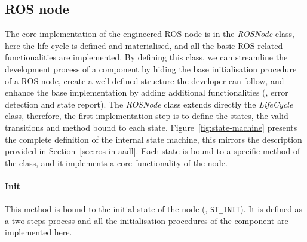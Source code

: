 \subsection{ROS node}
The core implementation of the engineered ROS node is in the \textit{ROSNode} class, here the life cycle is defined and materialised, and all the basic ROS-related functionalities are implemented. By defining this class, we can streamline the development process of a component by hiding the base initialisation procedure of a ROS node, create a well defined structure the developer can follow, and enhance the base implementation by adding additional functionalities (\eg, error detection and state report). The \textit{ROSNode} class extends directly the \textit{LifeCycle} class, therefore, the first implementation step is to define the states, the valid transitions and method bound to each state. Figure~\ref{fig:state-machine} presents the complete definition of the internal state machine, this mirrors the description provided in Section~\ref{sec:ros-in-aadl}. Each state is bound to a specific method of the class, and it implements a core functionality of the node.

\paragraph{Init} This method is bound to the initial state of the node (\ie, \texttt{ST\_INIT}). It is defined as a two-steps process and all the initialisation procedures of the component are implemented here.

